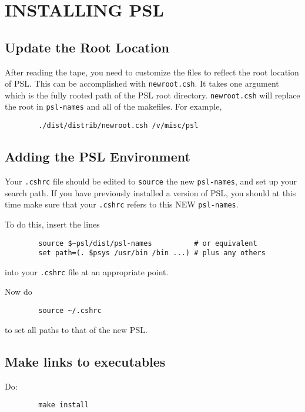 \section{INSTALLING PSL}

\subsection{Update the Root Location}

After reading the tape, you need to customize the files to reflect the
root location of PSL.  This can be accomplished with
{\tt newroot.csh}.  It takes one argument which is the fully rooted
path of the PSL root directory.  {\tt newroot.csh} will replace the root
in {\tt psl-names} and all of the makefiles.  For example,

\begin{verbatim}
        ./dist/distrib/newroot.csh /v/misc/psl
\end{verbatim}

\subsection{Adding the PSL Environment}

Your {\tt .cshrc} file should be edited to {\tt source} the new
{\tt psl-names}, and set up your search path.  If you have previously
installed a version of PSL, you should at this time make sure that
your {\tt .cshrc} refers to this NEW {\tt psl-names}.

To do this, insert the lines 
\begin{verbatim}
        source $~psl/dist/psl-names          # or equivalent
        set path=(. $psys /usr/bin /bin ...) # plus any others
\end{verbatim}
into your {\tt .cshrc} file at an appropriate point.

Now do
\begin{verbatim}
        source ~/.cshrc
\end{verbatim}
to set all paths to that of the new PSL.

\subsection{Make links to executables}

Do:

\begin{verbatim}
        make install
\end{verbatim}

